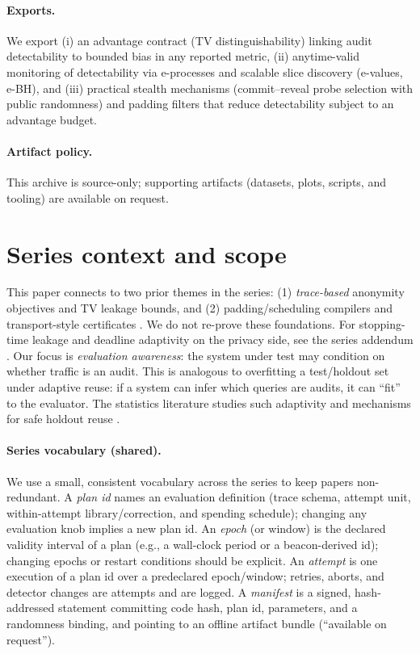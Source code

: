 \documentclass[11pt]{article}
\begin{document}
\paragraph{Exports.}
We export (i) an advantage contract (TV distinguishability) linking audit detectability to bounded bias in any reported metric, (ii) anytime-valid monitoring of detectability via e-processes and scalable slice discovery (e-values, e-BH), and (iii) practical stealth mechanisms (commit--reveal probe selection with public randomness) and padding filters that reduce detectability subject to an advantage budget.

\paragraph{Artifact policy.}
This archive is source-only; supporting artifacts (datasets, plots, scripts, and tooling) are available on request.\cite{series:artifactpolicy}


\section{Series context and scope}
This paper connects to two prior themes in the series:
(1) \emph{trace-based} anonymity objectives and TV leakage bounds, and
(2) padding/scheduling compilers and transport-style certificates \cite{series:schedcompiler,series:knapsacktransport}.
We do not re-prove these foundations.
For stopping-time leakage and deadline adaptivity on the privacy side, see the series addendum \cite{series:stoptimeaddendum}.
Our focus is \emph{evaluation awareness}: the system under test may condition on whether traffic is an audit.
This is analogous to overfitting a test/holdout set under adaptive reuse: if a system can infer which queries are audits, it can ``fit'' to the evaluator.
The statistics literature studies such adaptivity and mechanisms for safe holdout reuse \cite{dwork2015reusableholdout,dwork2014adaptive}.

\paragraph{Series vocabulary (shared).}
We use a small, consistent vocabulary across the series to keep papers non-redundant.
A \emph{plan id} names an evaluation definition (trace schema, attempt unit, within-attempt library/correction, and spending schedule);
changing any evaluation knob implies a new plan id.
An \emph{epoch} (or window) is the declared validity interval of a plan (e.g., a wall-clock period or a beacon-derived id); changing epochs or restart conditions should be explicit.
An \emph{attempt} is one execution of a plan id over a predeclared epoch/window; retries, aborts, and detector changes are attempts and are logged.
A \emph{manifest} is a signed, hash-addressed statement committing code hash, plan id, parameters, and a randomness binding, and pointing to an offline artifact bundle (``available on request'').
\end{document}
